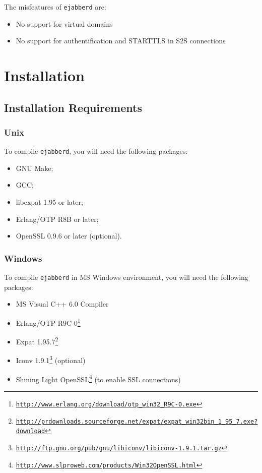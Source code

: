 \documentclass[a4paper,10pt]{article}
\newcommand{\ejabberd}{\texttt{ejabberd}}
\gdef\footahref#1#2{#2\footnote{\href{#1}{\texttt{#1}}}}
\begin{document}
The misfeatures of \ejabberd{} are:
\begin{itemize}
\item No support for virtual domains
\item No support for authentification and STARTTLS in S2S connections
\end{itemize}


\section{Installation}
\label{sec:installation}

\subsection{Installation Requirements}
\label{sec:installreq}

\subsubsection{Unix}
\label{sec:installrequnix}

To compile \ejabberd{}, you will need the following packages:
\begin{itemize}
\item GNU Make;
\item GCC;
\item libexpat 1.95 or later;
\item Erlang/OTP R8B or later;
\item OpenSSL 0.9.6 or later (optional).
\end{itemize}

\subsubsection{Windows}
\label{sec:installreqwin}

To compile \ejabberd{} in MS Windows environment, you will need the following
packages:
\begin{itemize}
\item MS Visual C++ 6.0 Compiler
\item \footahref{http://www.erlang.org/download/otp\_win32\_R9C-0.exe}{Erlang/OTP R9C-0}
\item \footahref{http://prdownloads.sourceforge.net/expat/expat\_win32bin\_1\_95\_7.exe?download}{Expat 1.95.7}
\item
\footahref{http://ftp.gnu.org/pub/gnu/libiconv/libiconv-1.9.1.tar.gz}{Iconv 1.9.1}
(optional)
\item \footahref{http://www.slproweb.com/products/Win32OpenSSL.html}{Shining Light OpenSSL}
(to enable SSL connections)
\end{itemize}
\end{document}
